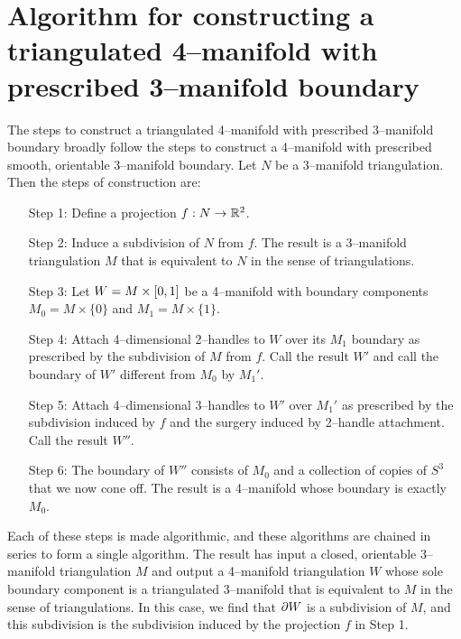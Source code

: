 \chapter[Triangulated]{Algorithm for constructing a triangulated 4--manifold with prescribed 3--manifold boundary}
\label{chapter:triangulation}

The steps to construct a triangulated 4--manifold with prescribed 3--manifold boundary broadly follow the steps to construct a 4--manifold with prescribed smooth, orientable 3--manifold boundary.
Let $N$ be a 3--manifold triangulation.
Then the steps of construction are:
\begin{enumerate}
	\item[Step 1:] Define a projection $f:N\to\mathbb{R}^2$.
	
	\item[Step 2:] Induce a subdivision of $N$ from $f$.  The result is a 3--manifold triangulation $M$ that is equivalent to $N$ in the sense of triangulations.

	\item[Step 3:] Let $W=M\times[0,1]$ be a 4--manifold with boundary components $M_0 = M\times\{0\}$ and $M_1 = M\times\{1\}$.
	
	\item[Step 4:] Attach 4--dimensional 2--handles to $W$ over its $M_1$ boundary as prescribed by the subdivision of $M$ from $f$.  Call the result $W'$ and call the boundary of $W'$ different from $M_0$ by $M_1'$.
	
	\item[Step 5:] Attach 4--dimensional 3--handles to $W'$ over $M_1'$ as prescribed by the subdivision induced by $f$ and the surgery induced by 2--handle attachment.  Call the result $W''$.
	
	\item[Step 6:] The boundary of $W''$ consists of $M_0$ and a collection of copies of $S^3$ that we now cone off.  The result is a 4--manifold whose boundary is exactly $M_0$.
\end{enumerate}

Each of these steps is made algorithmic, and these algorithms are chained in series to form a single algorithm.
The result has input a closed, orientable 3--manifold triangulation $M$ and output a 4--manifold triangulation $W$ whose sole boundary component is a triangulated 3--manifold that is equivalent to $M$ in the sense of triangulations.
In this case, we find that $\partial W$ is a subdivision of $M$, and this subdivision is the subdivision induced by the projection $f$ in Step 1.

